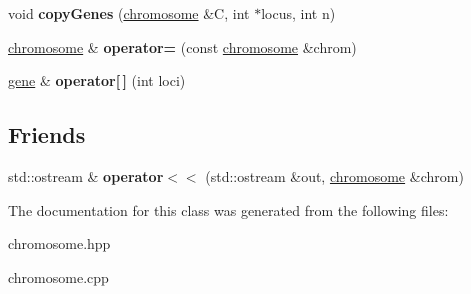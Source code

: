 \begin{DoxyCompactItemize}
\item 
\hypertarget{classchromosome_a384da1d2073cf447cb7bf79c4864e036}{void {\bfseries copy\-Genes} (\hyperlink{classchromosome}{chromosome} \&\-C, int $\ast$locus, int n)}\label{classchromosome_a384da1d2073cf447cb7bf79c4864e036}

\item 
\hypertarget{classchromosome_ab0c27ae003604d1804d6ef9336d57f05}{\hyperlink{classchromosome}{chromosome} \& {\bfseries operator=} (const \hyperlink{classchromosome}{chromosome} \&chrom)}\label{classchromosome_ab0c27ae003604d1804d6ef9336d57f05}

\item 
\hypertarget{classchromosome_aad4e29e2a423f99eca87410d2fc8fcdc}{\hyperlink{classgene}{gene} \& {\bfseries operator\mbox{[}$\,$\mbox{]}} (int loci)}\label{classchromosome_aad4e29e2a423f99eca87410d2fc8fcdc}

\end{DoxyCompactItemize}
\subsection*{\-Friends}
\begin{DoxyCompactItemize}
\item 
\hypertarget{classchromosome_a5e3abeefc268788bd44047749ff0f703}{std\-::ostream \& {\bfseries operator$<$$<$} (std\-::ostream \&out, \hyperlink{classchromosome}{chromosome} \&chrom)}\label{classchromosome_a5e3abeefc268788bd44047749ff0f703}

\end{DoxyCompactItemize}


\-The documentation for this class was generated from the following files\-:\begin{DoxyCompactItemize}
\item 
chromosome.\-hpp\item 
chromosome.\-cpp\end{DoxyCompactItemize}
